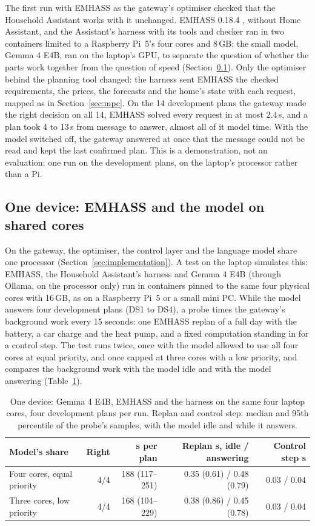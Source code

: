 The first run with EMHASS as the gateway's optimiser checked that the
Household Assistant works with it unchanged. EMHASS 0.18.4
\parencite{emhass}, without Home Assistant, and the Assistant's harness
with its tools and checker ran in two containers limited to a Raspberry
Pi~5's four cores and 8\,GB; the small model, Gemma 4 E4B, ran on the
laptop's GPU, to separate the question of whether the parts work
together from the question of speed (Section~\ref{sec:onedevice}).
Only the optimiser behind the planning tool changed: the harness sent
EMHASS the checked requirements, the prices, the forecasts and the
home's state with each request, mapped as in Section~\ref{sec:mpc}. On
the 14 development plans the gateway made the right decision on all 14,
EMHASS solved every request in at most 2.4\,s, and a plan took 4 to
13\,s from message to answer, almost all of it model time. With the
model switched off, the gateway answered at once that the message could
not be read and kept the last confirmed plan. This is a demonstration,
not an evaluation: one run on the development plans, on the laptop's
processor rather than a Pi.

\subsection{One device: EMHASS and the model on shared cores}
\label{sec:onedevice}

On the gateway, the optimiser, the control layer and the language model
share one processor (Section~\ref{sec:implementation}). A test on the
laptop simulates this: EMHASS, the Household Assistant's harness and
Gemma 4 E4B (through Ollama, on the processor only) run in containers
pinned to the same four physical cores with 16\,GB, as on a Raspberry
Pi~5 or a small mini PC. While the model answers four development plans
(DS1 to DS4), a probe times the gateway's background work every 15
seconds: one EMHASS replan of a full day with the battery, a car charge
and the heat pump, and a fixed computation standing in for a control
step. The test runs twice, once with the model allowed to use all four
cores at equal priority, and once capped at three cores with a low
priority, and compares the background work with the model idle and with
the model answering (Table~\ref{tab:onedevice}).

\begin{table}[htbp]
\caption{One device: Gemma 4 E4B, EMHASS and the harness on the same
four laptop cores, four development plans per run. Replan and control
step: median and 95th percentile of the probe's samples, with the model
idle and while it answers.}
\label{tab:onedevice}
\small
\begin{tabularx}{\textwidth}{@{}Xrrrr@{}}
\toprule
Model's share & Right & s per plan & Replan s, idle / answering & Control step s \\
\midrule
Four cores, equal priority & 4/4 & 188 (117--251) & 0.35 (0.61) / 0.48 (0.79) & 0.03 / 0.04 \\
Three cores, low priority & 4/4 & 168 (104--229) & 0.38 (0.86) / 0.45 (0.78) & 0.03 / 0.04 \\
\bottomrule
\end{tabularx}
\end{table}

